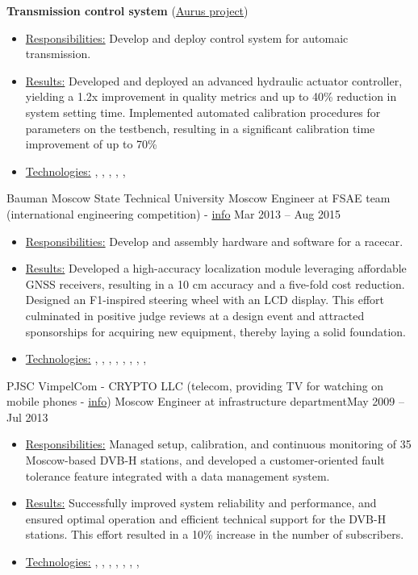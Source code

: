 \textbf{Transmission control system} (\href{https://en.wikipedia.org/wiki/Aurus_Senat}{Aurus project})
\begin{itemize}
    \item[] \underline{Responsibilities:} Develop and deploy control system for automaic transmission.
    \item[] \underline{Results:} Developed and deployed an advanced hydraulic actuator controller, yielding a 1.2x improvement in quality metrics and up to 40\% reduction in system setting time. Implemented automated calibration procedures for parameters on the testbench, resulting in a significant calibration time improvement of up to 70\%
   \item[] \underline{Technologies:} , ,  , , , 
\end{itemize}
\horizontalline
% 
\ressubheading
{Bauman Moscow State Technical University}
{}
{Moscow}
{Engineer at FSAE team (international engineering competition) - \href{https://baumanracing.ru/en/}{info}}
{Mar 2013 -- Aug 2015}
\begin{itemize}
    \item[] \underline{Responsibilities:} Develop and assembly hardware and software for a racecar.
    \item[] \underline{Results:} Developed a high-accuracy localization module leveraging affordable GNSS receivers, resulting in a 10 cm accuracy and a five-fold cost reduction. Designed an F1-inspired steering wheel with an LCD display. This effort culminated in positive judge reviews at a design event and attracted sponsorships for acquiring new equipment, thereby laying a solid foundation.
    \item[] \underline{Technologies:} , , , , , , , , 

\end{itemize}
\horizontalline
% 
\ressubheading
{PJSC VimpelCom - CRYPTO LLC}
{(telecom, providing TV for watching on mobile phones - \href{https://www.dvb.org/news/russia-to-launch-dvb-h-services}{info})}
{Moscow}
{Engineer at infrastructure department}{May 2009 -- Jul 2013}
\begin{itemize}
    \item[] \underline{Responsibilities:} Managed setup, calibration, and continuous monitoring of 35 Moscow-based DVB-H stations, and developed a customer-oriented fault tolerance feature integrated with a data management system.
    \item[] \underline{Results:}  Successfully improved system reliability and performance, and ensured optimal operation and efficient technical support for the DVB-H stations. This effort resulted in a 10\% increase in the number of subscribers.
    \item[] \underline{Technologies:}  , , , , , , , 
\end{itemize}
